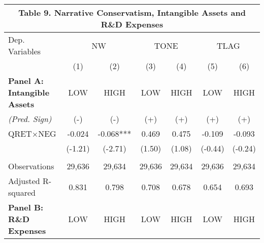 \begin{table}[H]   \label{T9}
  \begin{center}
  	    \begin{tabular}{lcccccc}
  		\multicolumn{7}{c}{\textbf{Table 9. Narrative Conservatism, Intangible Assets and R\&D Expenses}} \\
  		\midrule
  		\midrule
  		Dep. Variables & \multicolumn{2}{c}{NW} & \multicolumn{2}{c}{TONE} & \multicolumn{2}{c}{TLAG} \\
  		& (1) & \multicolumn{1}{c}{(2)} & (3) & \multicolumn{1}{c}{(4)} & (5) & \multicolumn{1}{c}{(6)} \\
  		\midrule
  		\textbf{Panel A: Intangible Assets} & LOW & HIGH & LOW & HIGH & LOW & HIGH \\
  		\cmidrule{2-7}
  		\rowcolor[rgb]{ .933,  .925,  .882} \textit{(Pred. Sign)} & (-) & (-) & (+) & (+) & (+) & (+) \\
  		\rowcolor[rgb]{ .933,  .925,  .882} QRET$\times$NEG & -0.024 & -0.068*** & 0.469 & 0.475 & -0.109 & -0.093 \\
  		\rowcolor[rgb]{ .933,  .925,  .882} & (-1.21) & (-2.71) & (1.50) & (1.08) & (-0.44) & (-0.24) \\
  		&   &   &   &   &   &  \\
  		Observations & 29,636 & 29,634 & 29,636 & 29,634 & 29,636 & 29,634 \\
  		Adjusted R-squared & 0.831 & 0.798 & 0.708 & 0.678 & 0.654 & 0.693 \\
  		\midrule
  		\textbf{Panel B: R\&D Expenses} & LOW & HIGH & LOW & HIGH & LOW & HIGH \\
  		\cmidrule{2-7}
  

\end{tabular}
\end{center}
\end{table}
